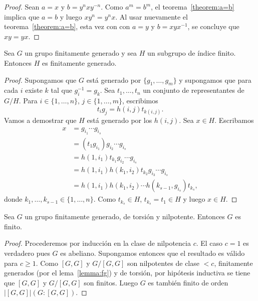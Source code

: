 \begin{proof}
	Sean $a=x$ y $b=y^nxy^{-n}$. Como $a^m=b^m$, el teorema~\ref{theorem:a=b}
	implica que $a=b$ y luego $xy^n=y^nx$. Al usar nuevamente el
	teorema~\ref{theorem:a=b}, esta vez con con $a=y$ y $b=xyx^{-1}$, se
	concluye que $xy=yx$. 
\end{proof}

\begin{lemma}
	\label{lemma:fg}
	Sea $G$ un grupo finitamente generado y sea $H$ un subgrupo de índice
	finito. Entonces $H$ es finitamente generado.
\end{lemma}

\begin{proof}
	Supongamos que $G$ está generado por $\{g_1,\dots,g_m\}$ y supongamos que
	para cada $i$ existe $k$ tal que $g_i^{-1}=g_k$. Sea $t_1,\dots,t_n$ un
	conjunto de representantes de $G/H$. Para $i\in\{1,\dots,n\}$,
	$j\in\{1,\dots,m\}$, escribimos
	\[
		t_ig_j=h(i,j)t_{k(i,j)}.
	\]
	Vamos a demostrar que $H$ está generado por los $h(i,j)$. Sea $x\in H$.
	Escribamos 
	\begin{align*}
	x &=g_{i_1}\cdots g_{i_s}\\
	&= (t_1g_{i_1})g_{i_2}\cdots g_{i_s}\\
	&= h(1,i_1)t_{k_1}g_{i_2}\cdots g_{i_s}\\
	&= h(1,i_1)h(k_1,i_2)t_{k_2}g_{i_3}\cdots g_{i_s}\\
	&= h(1,i_1)h(k_1,i_2)\cdots h(k_{s-1},g_{i_s})t_{k_s},
	\end{align*}
	donde $k_1,\dots,k_{s-1}\in\{1,\dots,n\}$. Como $t_{k_s}\in H$,
	$t_{k_s}=t_1\in H$ y luego $x\in H$.
\end{proof}

\begin{theorem}
	\label{theorem:T(G)finito}
	Sea $G$ un grupo finitamente generado, de torsión y nilpotente. Entonces
	$G$ es finito. 	
\end{theorem}

\begin{proof}
	Procederemos por inducción en la clase de nilpotencia $c$. El caso $c=1$ es
	verdadero pues $G$ es abeliano. Supongamos entonces que el resultado es
	válido para $c\geq1$.  Como $[G,G]$ y $G/[G,G]$ son nilpotentes de clase
	$<c$, finitamente generados (por el lema~\ref{lemma:fg}) y de torsión, por
	hipótesis inductiva se tiene que $[G,G]$ y $G/[G,G]$ son finitos. Luego $G$
	es también finito de orden $|[G,G]|(G:[G,G])$.
\end{proof}

